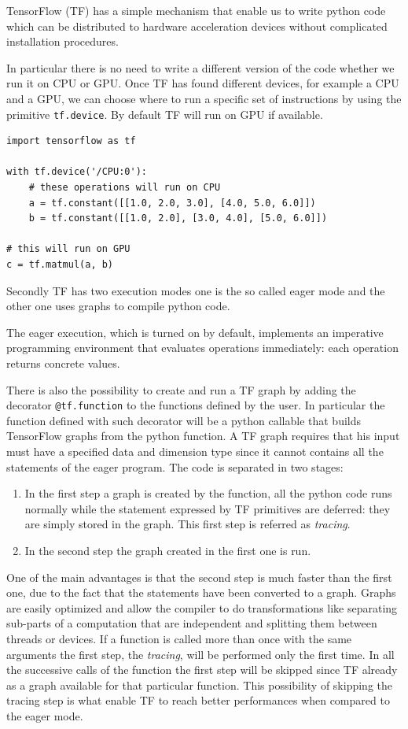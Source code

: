 \documentclass[../main/main.tex]{subfiles}
\begin{document}
TensorFlow (TF) has a simple mechanism that enable us to write python code which can be distributed to hardware 
 acceleration devices without complicated installation procedures.
 
 In particular there is no need to write a different version of the code whether we run it on CPU or GPU. Once TF has found different devices, for example a CPU and a GPU, we can choose where to run a specific set of instructions by using the primitive \texttt{tf.device}.
 By default TF will run on GPU if available.
 
\begin{verbatim}
import tensorflow as tf

with tf.device('/CPU:0'):
	# these operations will run on CPU
	a = tf.constant([[1.0, 2.0, 3.0], [4.0, 5.0, 6.0]])
	b = tf.constant([[1.0, 2.0], [3.0, 4.0], [5.0, 6.0]])
		
# this will run on GPU	
c = tf.matmul(a, b)
\end{verbatim}

Secondly TF has two execution modes one is the so called eager mode and the other one uses graphs to compile python code.

The eager execution, which is turned on by default, implements an imperative programming environment that evaluates operations immediately: each operation returns concrete values. 

There is also the possibility to create and run a  TF graph by adding the decorator \texttt{@tf.function} to the functions defined by the user. In particular the function defined with such decorator will be a python callable that builds TensorFlow graphs from the python function.
A TF graph requires that his input must have a specified data and dimension type since it cannot contains all the statements of the eager program. The code is separated in two stages:
\begin{enumerate}
	\item In the first step a graph is created by the function, all the python code runs normally while the statement expressed by TF primitives are deferred: they are simply stored in the graph. This first step is referred as \emph{tracing}.
	\item In the second step the graph created in the first one is run.
\end{enumerate}

One of the main advantages is that the second step is much faster than the first one, due to the fact that the statements have been converted to a graph. 
Graphs are easily optimized and allow the compiler to do transformations like separating sub-parts of a computation that are independent and splitting them between threads or devices.
If a function is called more than once with the same arguments the first step, the \emph{tracing}, will be performed only the first time. In all the successive calls of the function the first step will be skipped since TF already as a graph available for that particular function.
This possibility of skipping the tracing step is what enable TF to reach better performances when compared to the eager mode. 
\end{document}
